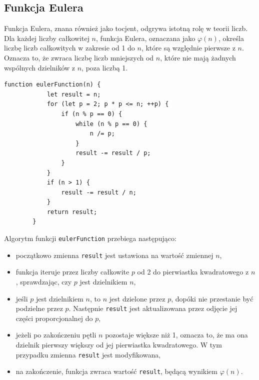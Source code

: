\documentclass{SGGW-thesis}
\begin{document}
	\subsection{Funkcja Eulera}
	Funkcja Eulera, znana również jako tocjent, odgrywa istotną rolę w teorii liczb. Dla każdej liczby całkowitej \( n \), funkcja Eulera, oznaczana jako \( \varphi(n) \), określa liczbę liczb całkowitych w zakresie od 1 do \( n \), które są względnie pierwsze z \( n \). Oznacza to, że zwraca liczbę liczb mniejszych od \( n \), które nie mają żadnych wspólnych dzielników z \( n \), poza liczbą 1.
	\vspace{1em}
	\begin{lstlisting}[caption=Funkcja obliczająca wartość funkcji Eulera w JavaScript]
		function eulerFunction(n) {
			let result = n;
			for (let p = 2; p * p <= n; ++p) {
				if (n % p == 0) {
					while (n % p == 0) {
						n /= p;
					}
					result -= result / p;
				}
			}
			if (n > 1) {
				result -= result / n;
			}
			return result;
		}
	\end{lstlisting}
	\vspace{1em}
	Algorytm funkcji \texttt{eulerFunction} przebiega następująco:
	\begin{itemize}
		\item początkowo zmienna \texttt{result} jest ustawiona na wartość zmiennej \( n \),
		\item funkcja iteruje przez liczby całkowite \( p \) od 2 do pierwiastka kwadratowego z \( n \), sprawdzając, czy \( p \) jest dzielnikiem \( n \),
		\item jeśli \( p \) jest dzielnikiem \( n \), to \( n \) jest dzielone przez \( p \), dopóki nie przestanie być podzielne przez \( p \). Następnie \texttt{result} jest aktualizowana przez odjęcie jej części proporcjonalnej do \( p \),
		\item jeżeli po zakończeniu pętli \( n \) pozostaje większe niż 1, oznacza to, że ma ona dzielnik pierwszy większy od jej pierwiastka kwadratowego. W tym przypadku zmienna \texttt{result} jest modyfikowana,
		\item na zakończenie, funkcja zwraca wartość \texttt{result}, będącą wynikiem \( \varphi(n) \).
	\end{itemize}
	\newpage
	
\end{document}
